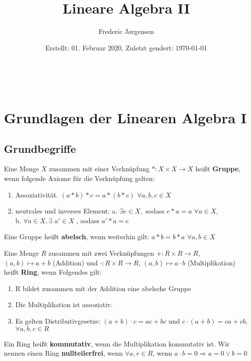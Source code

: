 \documentclass[8pt, a4paper, twocolumn, landscape]{article}
\title{Lineare Algebra II}
\author{Frederic Jørgensen}
\date{Erstellt: 01. Februar 2020, Zuletzt ge\aee ndert: \today \\                           %
	 \selectlanguage{ngerman}}
\begin{document}
\setlength{\abovedisplayskip}{2pt}
\setlength{\belowdisplayskip}{2pt}

\maketitle
\tableofcontents
\newpage
\begin{abstract}
	\centerline{}
\end{abstract}

\newpage \ \\
\newpage
\section{Grundlagen der Linearen Algebra I}
\subsection{Grundbegriffe}

\begin{definition}
Eine Menge $X$ zusammen mit einer Verknüpfung $* : X \times X \to X $ heißt \textbf{Gruppe}, wenn folgende Axiome für die Verknüpfung gelten:
\begin{enumerate}
\item Assoziativität. $ (a*b)*c = a*(b*c) $ $ \forall a,b,c \in X$
\item neutrales und inverses Element: a. $\exists e \in X,$ sodass $e*a = a $ $\forall a \in X$, \\
b. $\forall a \in X, \exists $ $ a' \in X$ , sodass $ a'*a = e$
\end{enumerate}
Eine Gruppe heißt \textbf{abelsch}, wenn weiterhin gilt: $ a*b = b*a $ $\forall a,b \in X$ 
\end{definition}

\begin{definition}
Eine Menge $R$ zusammen mit zwei Verknüpfungen 
$+ : R \times R \to R$, $(a,b) \mapsto a+b$ (Addition) und
$\cdot : R \times R \to R$, $(a,b) \mapsto a \cdot b$ (Multiplikation)
heißt \textbf{Ring}, wenn Folgendes gilt:
\begin{enumerate}
\item R bildet zusammen mit der Addition eine abelsche Gruppe
\item Die Multiplikation ist assoziativ.
\item Es gelten Distributivgesetze:
$ (a+b)\cdot c = ac + bc $ und $ c\cdot(a+b) = ca + cb$, $\forall a,b,c \in R$
\end{enumerate}
Ein Ring heißt \textbf{kommutativ}, wenn die Multiplikation kommutativ ist.
Wir nennen einen Ring \textbf{nullteilerfrei}, wenn $\forall a,r\in R$, wenn $a\cdot b = 0 \Rightarrow a=0 \lor b=0$ 
\end{definition}
\end{document}
